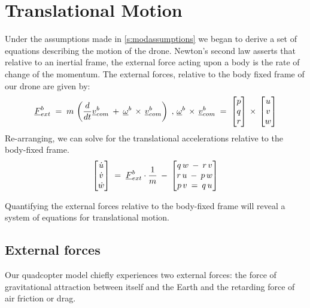 
\section{Translational Motion}

Under the assumptions made in \cref{s:modassumptions} we began to derive a set of equations describing the motion of the drone. Newton's second law asserts that relative to an inertial frame, the external force acting upon a body is the rate of change of the momentum. The external forces, relative to the body fixed frame of our drone are given by:
\begin{align*}\label{eq:newtonsecond}
	\colvec{F}^b_{ext}\;&=\;m\,\left(\frac{d}{dt}\colvec{v}^b_{com}\:+\:\colvec{\omega}^b\,\times\,\colvec{v}^b_{com}\right)\;,\,
	\colvec{\omega}^b\,\times\,\colvec{v}^b_{com}\;=\;\begin{bmatrix*}p\\q\\r\end{bmatrix*}\,\times\,\begin{bmatrix*}u\\v\\w\end{bmatrix*}\\
\end{align*}
Re-arranging, we can solve for the translational accelerations relative to the body-fixed frame.
\begin{align*}
	\begin{bmatrix}\dot{u}\\\dot{v}\\\dot{w}\end{bmatrix}\;=\;\colvec{F}^b_{ext}\cdot\frac{1}{m}\:-\:\begin{bmatrix*}q\,w\:-\:r\,v\\r\,u\:-\:p\,w\\p\,v\:=\:q\,u\end{bmatrix*}
\end{align*}

Quantifying the external forces relative to the body-fixed frame will reveal a system of equations for translational motion.

\subsection{External forces}
Our quadcopter model chiefly experiences two external forces: the force of gravitational attraction between itself and the Earth and the retarding force of air friction or drag.
